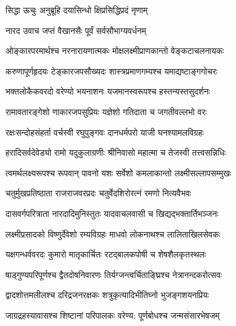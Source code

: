 

सिद्धा  ऊचुः
{अनुब्रूहि  दयासिन्धो  क्षिप्रसिद्धिप्रदं  नृणाम्}

नारद  उवाच
{जप्तं  वैखानसैः  पूर्वं  सर्वसौभाग्यवर्धनम्}

\twolineshloka
{ओङ्कारपरमार्थश्च  नरनारायणात्मकः}
{मोक्षलक्ष्मीप्राणकान्तो वेङ्कटाचलनायकः}

\twolineshloka
{करुणापूर्णहृदयः टेङ्कारजपसौख्यदः}
{शास्त्रप्रमाणगम्यश्च यमाद्यष्टाङ्गगोचरः}
    
\twolineshloka
{भक्तलोकैकवरदो वरेण्यो भयनाशनः}
{यजमानस्वरूपश्च हस्तन्यस्तसुदर्शनः}
        
\twolineshloka
{रामावतारङ्गेशो णाकारजपसुप्रियः}
{यज्ञेशो गतिदाता च जगतीवल्लभो वरः}
            
\twolineshloka
{रक्षःसन्दोहसंहर्ता वर्चस्वी रघुपुङ्गवः}
{दानधर्मपरो याजी घनश्यामलविग्रहः}
                
\twolineshloka
{हरादिसर्वदेवेड्यो रामो यदुकुलाग्रणीः}
{श्रीनिवासो महात्मा च तेजस्वी तत्त्वसन्निधिः}
                    
\twolineshloka
{त्वमर्थलक्ष्यरूपश्च रूपवान् पावनो यशः}
{सर्वेशो कमलाकान्तो लक्ष्मीसल्लापसम्मुखः}
                        
\twolineshloka
{चतुर्मुखप्रतिष्ठाता राजराजवरप्रदः}
{चतुर्वेदशिरोरत्नं रमणो नित्यवैभवः }
                            
\twolineshloka
{दासवर्गपरित्राता नारदादिमुनिस्तुतः}
{यादवाचलवासी च खिद्यद्भक्तार्तिभञ्जनः }
                                
\twolineshloka
{लक्ष्मीप्रसादको विष्णुर्देवेशो रम्यविग्रहः}
{माधवो लोकनाथश्च लालिताखिलसेवकः }
                                    
\twolineshloka
{यक्षगन्धर्ववरदः कुमारो मातृकार्चितः}
{रटद्बालकपोषी च शेषशैलकृतस्थलः }
                                        
\twolineshloka
{षाड्गुण्यपरिपूर्णश्च द्वैतदोषनिवारणः}
{तिर्यग्जन्त्वर्चिताङ्घ्रिश्च नेत्रानन्दकरोत्सवः }
                                            
\twolineshloka
{द्वादशोत्तमलीलश्च दरिद्रजनरक्षकः}
{शत्रुकृत्यादिभीतिघ्नो भुजङ्गशयनप्रियः}
                                                
\twolineshloka
{जाग्रद्रहस्यावासश्च शिष्टानां  परिपालकः}
{वरेण्य: पूर्णबोधश्च जन्मसंसारभेषजम् }
                                                    
